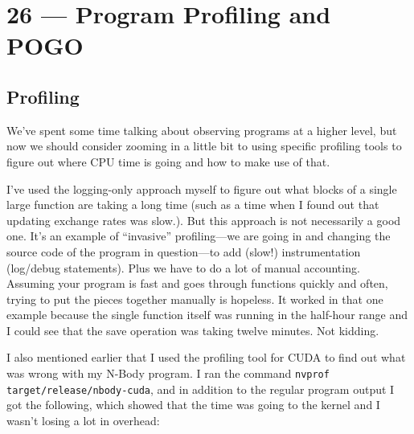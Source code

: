 \documentclass[a4paper]{report}
\begin{document}
\chapter*{26 --- Program Profiling and POGO}


\section*{Profiling}
We've spent some time talking about observing programs at a higher level, but now we should consider zooming in a little bit to using specific profiling tools to figure out where CPU time is going and how to make use of that.

I've used the logging-only approach myself to figure out what blocks of a single large function are taking a long time (such as a time when I found out that updating exchange rates was slow.). But this approach is not necessarily a good one.  It's an example of ``invasive'' profiling---we are going in and changing the source code of the program in question---to add (slow!) instrumentation (log/debug statements). Plus we have to do a lot of manual accounting. Assuming your program is fast and goes through functions quickly and often, trying to put the pieces together manually is hopeless. It worked in that one example because the single function itself was running in the half-hour range and I could see that the save operation was taking twelve minutes. Not kidding.

I also mentioned earlier that I used the profiling tool for CUDA to find out what was wrong with my N-Body program. I ran the command \texttt{nvprof target/release/nbody-cuda}, and in addition to the regular program output I got the following, which showed that the time was going to the kernel and I wasn't losing a lot in overhead:
\end{document}
